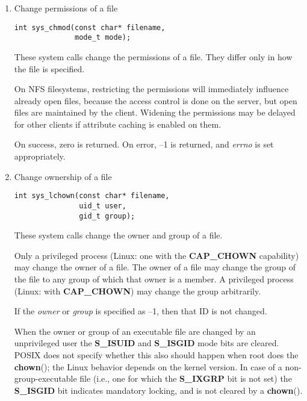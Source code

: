 \documentclass[twoside]{article}
\begin{document}
\begin{multicols}{2}
\begin{enumerate}
{\bf mknod}{\rm ()}
returns zero on success, or --1 if an error occurred (in which case,
{\it errno}
is set appropriately).


\item
Change permissions of a file
{\footnotesize
\begin{lstlisting}
int sys_chmod(const char* filename,
              mode_t mode);
\end{lstlisting}
\par}

These system calls change the permissions of a file.
They differ only in how the file is specified.

On NFS filesystems, restricting the permissions will immediately influence
already open files, because the access control is done on the server, but
open files are maintained by the client.
Widening the permissions may be
delayed for other clients if attribute caching is enabled on them.

On success, zero is returned.
On error, --1 is returned, and
{\it errno}
is set appropriately.

\item
Change ownership of a file
{\footnotesize
\begin{lstlisting}
int sys_lchown(const char* filename, 
               uid_t user, 
               gid_t group);
\end{lstlisting}
\par}

These system calls change the owner and group of a file.

Only a privileged process (Linux: one with the
{\bf CAP\_CHOWN}
capability) may change the owner of a file.
The owner of a file may change the group of the file
to any group of which that owner is a member.
A privileged process (Linux: with
{\bf CAP\_CHOWN}{\rm )}
may change the group arbitrarily.

If the
{\it owner}
or
{\it group}
is specified as --1, then that ID is not changed.

When the owner or group of an executable file are
changed by an unprivileged user the
{\bf S\_ISUID}
and
{\bf S\_ISGID}
mode bits are cleared.
POSIX does not specify whether
this also should happen when root does the
{\bf chown}{\rm ();}
the Linux behavior depends on the kernel version.
In case of a non-group-executable file (i.e., one for which the
{\bf S\_IXGRP}
bit is not set) the
{\bf S\_ISGID}
bit indicates mandatory locking, and is not cleared by a
{\bf chown}{\rm ().}


\end{enumerate}
\end{multicols}
\end{document}
